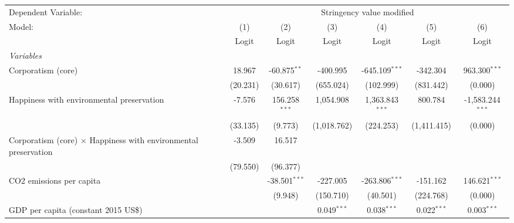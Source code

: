 
\begingroup
\centering
\begin{tabular}{lcccccc}
   \toprule
   Dependent Variable: & \multicolumn{6}{c}{Stringency value modified}\\
   Model:                                                                 & (1)      & (2)             & (3)           & (4)               & (5)           & (6)\\  
                                                                          &  Logit   & Logit           & Logit         & Logit             & Logit         & Logit\\  
   \midrule
   \emph{Variables}\\
   Corporatism (core)                                                     & 18.967   & -60.875$^{**}$  & -400.995      & -645.109$^{***}$  & -342.304      & 963.300$^{***}$\\   
                                                                          & (20.231) & (30.617)        & (655.024)     & (102.999)         & (831.442)     & (0.000)\\   
   Happiness with environmental preservation                              & -7.576   & 156.258$^{***}$ & 1,054.908     & 1,363.843$^{***}$ & 800.784       & -1,583.244$^{***}$\\   
                                                                          & (33.135) & (9.773)         & (1,018.762)   & (224.253)         & (1,411.415)   & (0.000)\\   
   Corporatism (core) $\times$ Happiness with environmental preservation  & -3.509   & 16.517          &               &                   &               &   \\   
                                                                          & (79.550) & (96.377)        &               &                   &               &   \\   
   CO2 emissions per capita                                               &          & -38.501$^{***}$ & -227.005      & -263.806$^{***}$  & -151.162      & 146.621$^{***}$\\   
                                                                          &          & (9.948)         & (150.710)     & (40.501)          & (224.768)     & (0.000)\\   
   GDP per capita (constant 2015 US\$)                                    &          &                 & 0.049$^{***}$ & 0.038$^{***}$     & 0.022$^{***}$ & 0.003$^{***}$\\   

\end{tabular}
